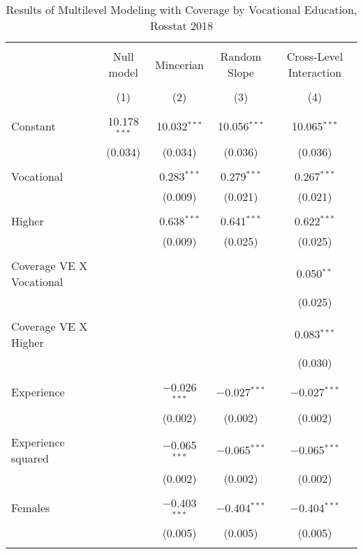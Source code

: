 \documentclass[alpha-refs]{wiley-article-04t}
\begin{document}
\begin{table}[!htbp] \centering 
	\caption{Results of Multilevel Modeling with Coverage by Vocational Education, Rosstat 2018} 
	\label{tab:A2} 
	\begin{tabular}{@{\extracolsep{5pt}}lcccc} 
		\\[-1.8ex]\hline 
		\hline \\[-1.8ex] 
		& Null model & Mincerian & Random Slope & Cross-Level Interaction \\ 
		\\[-1.8ex] & (1) & (2) & (3) & (4)\\ 
		\hline \\[-1.8ex] 
		Constant & 10.178$^{***}$ & 10.032$^{***}$ & 10.056$^{***}$ & 10.065$^{***}$ \\ 
		& (0.034) & (0.034) & (0.036) & (0.036) \\ 
		& & & & \\ 
		Vocational &  & 0.283$^{***}$ & 0.279$^{***}$ & 0.267$^{***}$ \\ 
		&  & (0.009) & (0.021) & (0.021) \\ 
		& & & & \\ 
		Higher &  & 0.638$^{***}$ & 0.641$^{***}$ & 0.622$^{***}$ \\ 
		&  & (0.009) & (0.025) & (0.025) \\ 
		& & & & \\ 
		Coverage VE X Vocational &  &  &  & 0.050$^{**}$ \\ 
		&  &  &  & (0.025) \\ 
		& & & & \\ 
		Coverage VE X Higher &  &  &  & 0.083$^{***}$ \\ 
		&  &  &  & (0.030) \\ 
		& & & & \\ 
		Experience &  & $-$0.026$^{***}$ & $-$0.027$^{***}$ & $-$0.027$^{***}$ \\ 
		&  & (0.002) & (0.002) & (0.002) \\ 
		& & & & \\ 
		Experience squared &  & $-$0.065$^{***}$ & $-$0.065$^{***}$ & $-$0.065$^{***}$ \\ 
		&  & (0.002) & (0.002) & (0.002) \\ 
		& & & & \\ 
		Females &  & $-$0.403$^{***}$ & $-$0.404$^{***}$ & $-$0.404$^{***}$ \\ 
		&  & (0.005) & (0.005) & (0.005) \\ 
		& & & & \\ 

\end{tabular}
\end{table}
\end{document}

